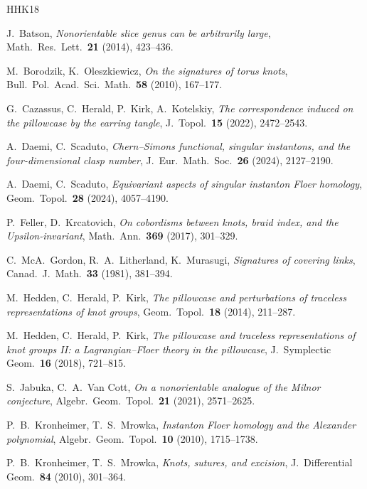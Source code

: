 \documentclass[11pt,reqno]{amsart}
\theoremstyle{plain}
\theoremstyle{definition}
\begin{document}
\begin{thebibliography}{HHK18}

 J.~Batson, \emph{Nonorientable slice genus can be arbitrarily large}, Math.\ Res.\
Lett.\ \textbf{21} (2014), 423--436.

 M.~Borodzik, K.~Oleszkiewicz, \emph{On the signatures of torus knots}, Bull.\ Pol.\
Acad.\ Sci.\ Math.\ \textbf{58} (2010), 167--177.

 G.~Cazassus, C.~Herald, P.~Kirk, A.~Kotelskiy, \emph{The correspondence induced on
the pillowcase by the earring tangle}, J.\ Topol.\ \textbf{15} (2022), 2472--2543.

\bibitem[DS24a]{DScaduto} A.~Daemi, C.~Scaduto, \emph{Chern--Simons functional, singular instantons, and
the four-dimensional clasp number}, J.\ Eur.\ Math.\ Soc.\ \textbf{26} (2024), 2127--2190.

\bibitem[DS24b]{DSEquiv} A.~Daemi, C.~Scaduto, \emph{Equivariant aspects of singular instanton Floer
homology}, Geom.\ Topol.\ \textbf{28} (2024), 4057--4190.

 P.~Feller, D.~Krcatovich, \emph{On cobordisms between knots, braid index, and the
Upsilon-invariant}, Math.\ Ann.\ \textbf{369} (2017), 301--329.

\bibitem[GLM81]{GLM} C.~McA.~Gordon, R.~A.~Litherland, K.~Murasugi, \emph{Signatures of covering links},
Canad.\ J.\ Math.\ \textbf{33} (1981), 381--394.

 M.~Hedden, C.~Herald, P.~Kirk, \emph{The pillowcase and perturbations of traceless
representations of knot groups}, Geom.\ Topol.\ \textbf{18} (2014), 211--287.

\bibitem[HHK18]{HHK2} M.~Hedden, C.~Herald, P.~Kirk, \emph{The pillowcase and traceless representations of
knot groups II: a Lagrangian--Floer theory in the pillowcase}, J.\ Symplectic Geom.\ \textbf{16} (2018),
721--815.

 S.~Jabuka, C.~A.~Van Cott, \emph{On a nonorientable analogue of the Milnor
conjecture}, Algebr.\ Geom.\ Topol.\ \textbf{21} (2021), 2571--2625.

\bibitem[KM10a]{KMAlex} P.~B.~Kronheimer, T.~S.~Mrowka, \emph{Instanton Floer homology and the
Alexander polynomial}, Algebr.\ Geom.\ Topol.\ \textbf{10} (2010), 1715--1738.

\bibitem[KM10b]{KMsut} P.~B.~Kronheimer, T.~S.~Mrowka, \emph{Knots, sutures, and excision}, J.\
Differential Geom.\ \textbf{84} (2010), 301--364.


\end{thebibliography}
\end{document}
